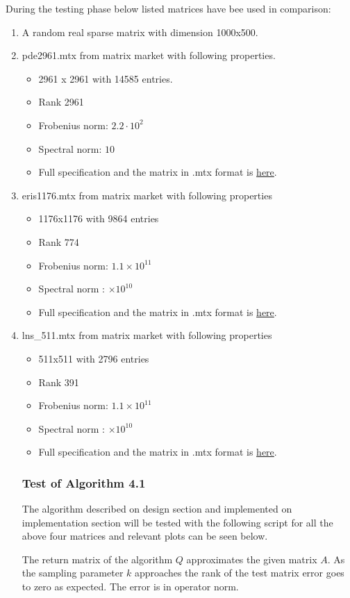 \documentclass[11pt,a4paper]{article}
\theoremstyle{definition}
\begin{document}
	During the testing phase below listed matrices have bee used in comparison:
	\begin{enumerate}
	\item A random real sparse matrix with dimension 1000x500.
	\item pde2961.mtx from matrix market with following properties.
		\begin{itemize}
			\item 2961 x 2961 with 14585 entries.
			\item Rank 2961
			\item Frobenius norm: $2.2\cdot 10^2$
			\item Spectral norm: $10$
			\item Full specification and the matrix in .mtx format is \href{https://math.nist.gov/MatrixMarket/data/NEP/matpde/pde2961.html}{here}.
		\end{itemize}
	\item eris1176.mtx from matrix market with following properties
		\begin{itemize}
			\item 1176x1176 with 9864 entries
			\item Rank 774
			\item Frobenius norm: $1.1 \times 10^{11}$
			\item Spectral norm : $\times 10^{10}$
			\item Full specification and the matrix in .mtx format is \href{https://math.nist.gov/MatrixMarket/data/Harwell-Boeing/smtape/eris1176.html}{here}.
		\end{itemize}
	\item lns\_511.mtx from matrix market with following properties
		\begin{itemize}
			\item 511x511 with 2796 entries
			\item Rank 391
			\item Frobenius norm: $1.1 \times 10^{11}$
			\item Spectral norm : $\times 10^{10}$
			\item Full specification and the matrix in .mtx format is \href{https://math.nist.gov/MatrixMarket/data/Harwell-Boeing/lns/lns__511.html}{here}.
		\end{itemize}
	\subsubsection{Test of Algorithm 4.1}
	The algorithm described on design section and implemented on implementation section will be tested with the following script for all the above four matrices and relevant plots can be seen below.
	
	The return matrix of the algorithm $Q$ approximates the given matrix $A$. As the sampling parameter $k$ approaches the rank of the test matrix error goes to zero as expected. The error is in operator norm.
	\end{enumerate} 
\end{document}
